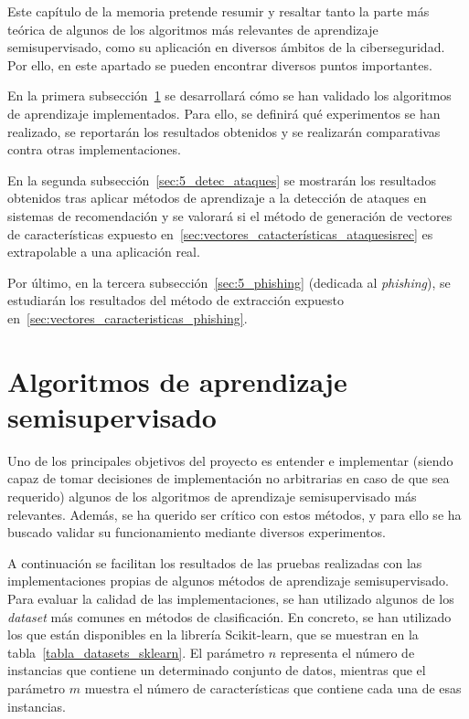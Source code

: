 
Este capítulo de la memoria pretende resumir y resaltar tanto la parte más teórica de algunos de los algoritmos más relevantes de aprendizaje semisupervisado, como su aplicación en diversos ámbitos de la ciberseguridad. Por ello, en este apartado se pueden encontrar diversos puntos importantes.

En la primera subsección~\ref{sec:5_ssl} se desarrollará cómo se han validado los algoritmos de aprendizaje implementados. Para ello, se definirá qué experimentos se han realizado, se reportarán los resultados obtenidos y se realizarán comparativas contra otras implementaciones.

En la segunda subsección~\ref{sec:5_detec_ataques} se mostrarán los resultados obtenidos tras aplicar métodos de aprendizaje a la detección de ataques en sistemas de recomendación y se valorará si el método de generación de vectores de características expuesto en~\ref{sec:vectores_catacterísticas_ataquesisrec} es extrapolable a una aplicación real.

Por último, en la tercera subsección~\ref{sec:5_phishing} (dedicada al \textit{phishing}), se estudiarán los resultados del método de extracción expuesto en~\ref{sec:vectores_caracteristicas_phishing}.

\section{Algoritmos de aprendizaje semisupervisado}
\label{sec:5_ssl}

Uno de los principales objetivos del proyecto es entender e implementar (siendo capaz de tomar decisiones de implementación no arbitrarias en caso de que sea requerido) algunos de los algoritmos de aprendizaje semisupervisado más relevantes. Además, se ha querido ser crítico con estos métodos, y para ello se ha buscado validar su funcionamiento mediante diversos experimentos.

A continuación se facilitan los resultados de las pruebas realizadas con las implementaciones propias de algunos métodos de aprendizaje semisupervisado. Para evaluar la calidad de las implementaciones, se han utilizado algunos de los \textit{dataset} más comunes en métodos de clasificación. En concreto, se han utilizado los que están disponibles en la librería Scikit-learn, que se muestran en la tabla~\ref{tabla_datasets_sklearn}. El parámetro $n$ representa el número de instancias que contiene un determinado conjunto de datos, mientras que el parámetro $m$ muestra el número de características que contiene cada una de esas instancias.

